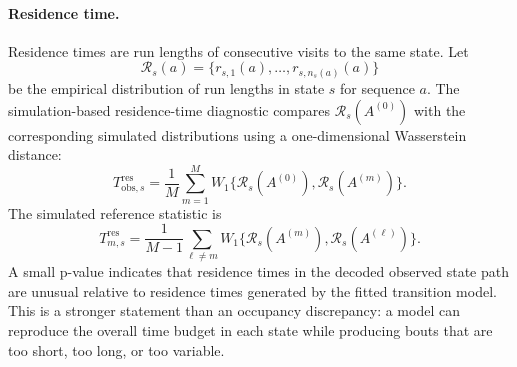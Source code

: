 \documentclass[11pt]{article}
\begin{document}
\paragraph{Residence time.}
Residence times are run lengths of consecutive visits to the same state. Let
\[
  \mathcal{R}_s(a)
  =
  \{r_{s,1}(a),\ldots,r_{s,n_s(a)}(a)\}
\]
be the empirical distribution of run lengths in state $s$ for sequence $a$.
The simulation-based residence-time diagnostic compares
$\mathcal{R}_s(A^{(0)})$ with the corresponding simulated distributions using a
one-dimensional Wasserstein distance:
\begin{equation}
  T_{\mathrm{obs},s}^{\mathrm{res}}
  =
  \frac{1}{M}
  \sum_{m=1}^{M}
  W_1\{\mathcal{R}_s(A^{(0)}),\mathcal{R}_s(A^{(m)})\}.
  \label{eq:res-tobs}
\end{equation}
The simulated reference statistic is
\begin{equation}
  T_{m,s}^{\mathrm{res}}
  =
  \frac{1}{M-1}
  \sum_{\ell \ne m}
  W_1\{\mathcal{R}_s(A^{(m)}),\mathcal{R}_s(A^{(\ell)})\}.
  \label{eq:res-tsim}
\end{equation}
A small p-value indicates that residence times in the decoded observed state
path are unusual relative to residence times generated by the fitted transition
model. This is a stronger statement than an occupancy discrepancy: a model can
reproduce the overall time budget in each state while producing bouts that are
too short, too long, or too variable.
\end{document}
